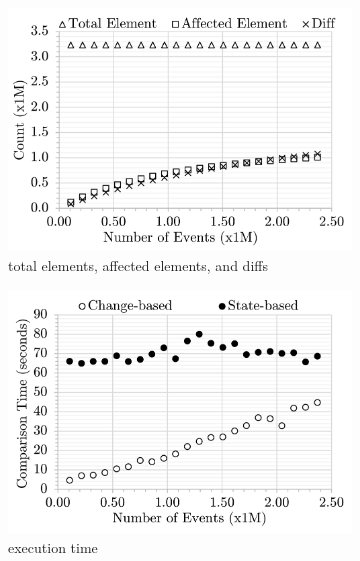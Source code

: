 \begin{figure}[ht]
    \begin{subfigure}[]{0.33\linewidth}
    \includegraphics[width=\linewidth]{mixed-count-events}
    \caption{total elements, affected elements, and diffs}
    \label{fig:modification_course}
    \end{subfigure}
    \begin{subfigure}[]{0.33\linewidth}
        \includegraphics[width=\linewidth]{mixed-time-events}
        \caption{execution time}
        \label{fig:time_diffs}
    \end{subfigure}
    \begin{subfigure}[]{0.33\linewidth}

\end{subfigure}
\end{figure}
